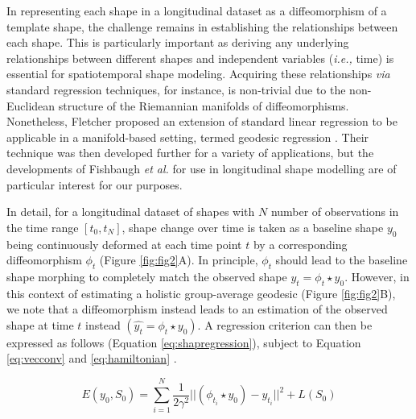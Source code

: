 			In representing each shape in a longitudinal dataset as a diffeomorphism of a template shape, the challenge remains in establishing the relationships between each shape. This is particularly important as deriving any underlying relationships between different shapes and independent variables (\textit{i.e.,} time) is essential for spatiotemporal shape modeling. Acquiring these relationships \textit{via} standard regression techniques, for instance, is non-trivial due to the non-Euclidean structure of the Riemannian manifolds of diffeomorphisms. Nonetheless, Fletcher proposed an extension of standard linear regression to be applicable in a manifold-based setting, termed geodesic regression \cite{fletcher2011, ThomasFletcher2012}. Their technique was then developed further for a variety of applications, but the developments of Fishbaugh \textit{et al.} for use in longitudinal shape modelling are of particular interest \cite{Fishbaugh2013, Fishbaugh2017} for our purposes. 
			
			In detail, for a longitudinal dataset of shapes with $N$ number of observations in the time range $[t_{0}, t_{N}]$, shape change over time is taken as a baseline shape $y_{0}$ being continuously deformed at each time point $t$ by a corresponding diffeomorphism $\phi_t$ (Figure \ref{fig:fig2}A). In principle, $\phi_t$ should lead to the baseline shape morphing to completely match the observed shape $y_{t} = \phi_{t} \star y_{0}$. However, in this context of estimating a holistic group-average geodesic (Figure \ref{fig:fig2}B), we note that a diffeomorphism instead leads to an estimation of the observed shape at time $t$ instead $(\hat{y_{t}} = \phi_{t} \star y_{0})$. A regression criterion can then be expressed as follows (Equation \ref{eq:shapregression}), subject to Equation \ref{eq:vecconv} and \ref{eq:hamiltonian} \cite{Fishbaugh2013, Fishbaugh2017}. 
			
			\begin{equation}
				E(y_{0}, S_{0}) = \sum_{i=1}^{N_{}} \frac{1}{2 \gamma^{2}} \vert\vert (\phi_{t_{i}} \star y_{0}) - y_{t_{i}} \vert\vert^{2} + L(S_{0})
				\label{eq:shapregression} 
			\end{equation}
			
